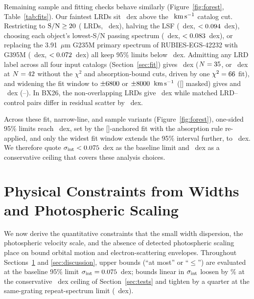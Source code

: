 \documentclass[twocolumn,linenumbers]{aastex701}
\newcommand{\kms}{\ensuremath{{\rm km\,s^{-1}}}}
\newcommand{\sigint}{\sigma_{\rm int}}
\newcommand{\BX}{BX26}
\begin{document}
Remaining sample and fitting checks behave similarly (Figure~\ref{fig:forest}, Table~\ref{tab:fits}).
Our faintest LRDs sit \floorDex{}~dex above the \HvidingCut{}~\kms{} catalog cut.
Restricting to ${\rm S/N}\geq20$ (\NSNtwenty{} LRDs, \sigSNtwenty{}~dex), halving the LSF (\FsigLsf{}~dex, $<0.094{}$~dex), choosing each object's lowest-S/N passing spectrum (\FsigLowSN{}~dex, $<0.083{}$~dex), or replacing the 3.91~$\mu$m G235M primary spectrum of RUBIES-EGS-42232 with G395M (\FsigSwap{}~dex, $<0.072{}$~dex) all keep 95\% limits below \FsigCons{}~dex.
Admitting any LRD label across all four input catalogs (Section~\ref{sec:fit}) gives \sigIncB{}~dex ($N=35{}$, or \sigIncD{}~dex at $N=42{}$ without the $\chi^2$ and absorption-bound cuts, driven by one $\chi^2=66{}$ fit), and widening the fit window to $\pm6800{}$ or $\pm8000{}$~\kms{} ([] masked) gives \FsigWin{} and \FsigWinWide{}~dex (\FsigWinWidelo{}--\FsigWinWidehi{}).
In \BX{}, the \NXNoOv{} non-overlapping LRDs give \XsigNoOv{}~dex while \NXPairs{} matched LRD--control pairs differ in residual scatter by \XdMatch{}~dex.

Across these fit, narrow-line, and sample variants (Figure~\ref{fig:forest}), one-sided 95\% limits reach \FsigCons{}~dex, set by the []-anchored fit with the absorption rule re-applied, and only the widest fit window extends the 95\% interval further, to \FsigWinWidehi{}~dex.
We therefore quote $\sigint<\FsigUp{}$~dex as the baseline limit and \FsigCons{}~dex as a conservative ceiling that covers these analysis choices.

\section{Physical Constraints from Widths and Photospheric Scaling} \label{sec:physics}

We now derive the quantitative constraints that the small width dispersion, the photospheric velocity scale, and the absence of detected photospheric scaling place on bound orbital motion and electron-scattering envelopes.
Throughout Sections~\ref{sec:physics} and \ref{sec:discussion}, upper bounds (``at most'' or ``$\leq$'') are evaluated at the baseline 95\% limit $\sigint=\FsigUp{}$~dex; bounds linear in $\sigint$ loosen by \narCeilLoosenPct{}\% at the conservative \FsigCons{}~dex ceiling of Section~\ref{sec:tests} and tighten by a quarter at the same-grating repeat-spectrum limit (\FsigFlrSameUp{}~dex).
\end{document}
